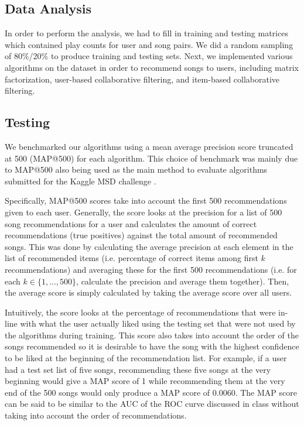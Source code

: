 \documentclass[11pt,preprint]{aastex}
\begin{document}
\subsection{Data Analysis}
In order to perform the analysis, we had to fill in training and testing matrices which contained play counts for user and song pairs. We did a random sampling of 80\%/20\% to produce training and testing sets. Next, we implemented various algorithms on the dataset in order to recommend songs to users, including matrix factorization, user-based collaborative filtering, and item-based collaborative filtering.

\subsection{Testing}
We benchmarked our algorithms using a mean average precision score truncated at 500 (MAP@500) for each algorithm. This choice of benchmark was mainly due to MAP@500 also being used as the main method to evaluate algorithms submitted for the Kaggle MSD challenge \citep{McFee:2012:MSD:2187980.2188222}.

Specifically, MAP@500 scores take into account the first 500 recommendations given to each user. Generally, the score looks at the precision for a list of 500 song recommendations for a user and calculates the amount of correct recommendations (true positives) against the total amount of recommended songs. This was done by calculating the average precision at each element in the list of recommended items (i.e. percentage of correct items among first $k$ recommendations) and averaging these for the first 500 recommendations (i.e. for each $k \in \{1, ..., 500\}$, calculate the precision and average them together). Then, the average score is simply calculated by taking the average score over all users.

Intuitively, the score looks at the percentage of recommendations that were in-line with what the user actually liked using the testing set that were not used by the algorithms during training. This score also takes into account the order of the songs recommended so it is desirable to have the song with the highest confidence to be liked at the beginning of the recommendation list. For example, if a user had a test set list of five songs, recommending these five songs at the very beginning would give a MAP score of 1 while recommending them at the very end of the 500 songs would only produce a MAP score of 0.0060. The MAP score can be said to be similar to the AUC of the ROC curve discussed in class without taking into account the order of recommendations.
\end{document}
